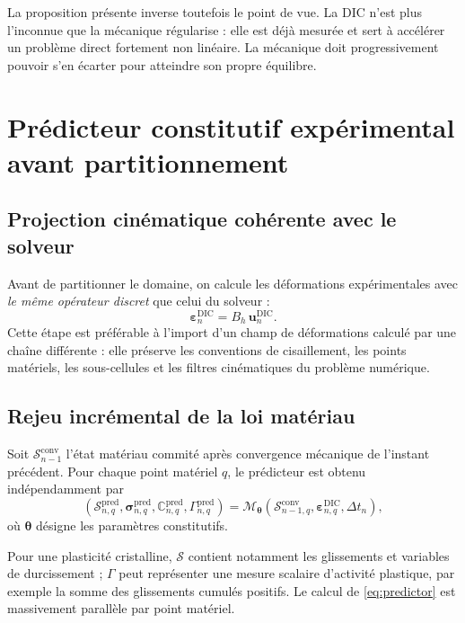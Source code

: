 \documentclass[11pt,a4paper]{article}
\newcommand{\udic}{\bm{u}^{\mathrm{DIC}}}
\newcommand{\epsdic}{\bm{\varepsilon}^{\mathrm{DIC}}}
\newcommand{\state}{\mathcal{S}}
\begin{document}
La proposition présente inverse toutefois le point de vue. La DIC n'est plus l'inconnue que la
mécanique régularise : elle est déjà mesurée et sert à accélérer un problème direct fortement non
linéaire. La mécanique doit progressivement pouvoir s'en écarter pour atteindre son propre équilibre.

\section{Prédicteur constitutif expérimental avant partitionnement}

\subsection{Projection cinématique cohérente avec le solveur}

Avant de partitionner le domaine, on calcule les déformations expérimentales avec \emph{le même
opérateur discret} que celui du solveur :
\begin{equation}
  \epsdic_n = B_h\,\udic_n .
\end{equation}
Cette étape est préférable à l'import d'un champ de déformations calculé par une chaîne différente :
elle préserve les conventions de cisaillement, les points matériels, les sous-cellules et les filtres
cinématiques du problème numérique.

\subsection{Rejeu incrémental de la loi matériau}

Soit $\state_{n-1}^{\mathrm{conv}}$ l'état matériau commité après convergence mécanique de l'instant
précédent. Pour chaque point matériel $q$, le prédicteur est obtenu indépendamment par
\begin{equation}
  \left(
  \state_{n,q}^{\mathrm{pred}},
  \bm{\sigma}_{n,q}^{\mathrm{pred}},
  \mathbb{C}_{n,q}^{\mathrm{pred}},
  \Gamma_{n,q}^{\mathrm{pred}}
  \right)
  =
  \mathcal{M}_{\bm{\theta}}
  \left(
  \state_{n-1,q}^{\mathrm{conv}},
  \epsdic_{n,q},
  \Delta t_n
  \right),
  \label{eq:predictor}
\end{equation}
où $\bm{\theta}$ désigne les paramètres constitutifs.

Pour une plasticité cristalline, $\state$ contient notamment les glissements et variables de
durcissement ; $\Gamma$ peut représenter une mesure scalaire d'activité plastique, par exemple la
somme des glissements cumulés positifs. Le calcul de \eqref{eq:predictor} est massivement parallèle
par point matériel.
\end{document}
